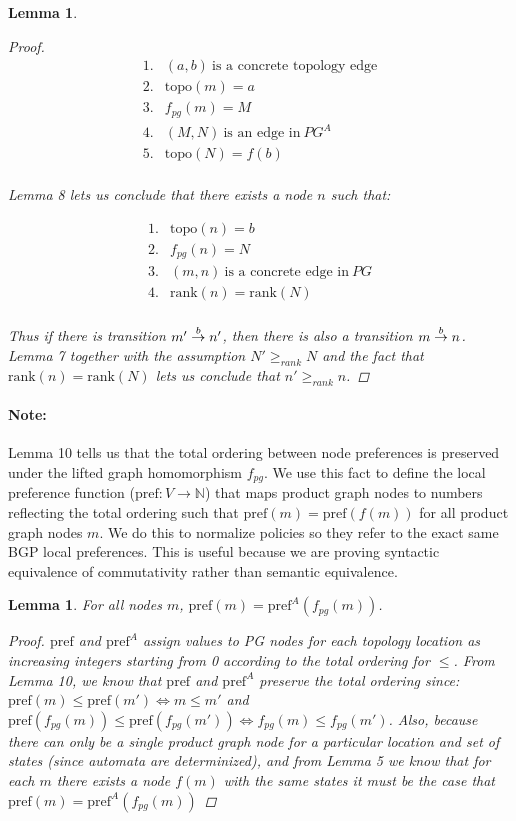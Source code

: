 \documentclass[twocolumn, openany]{sig-alternate-10pt}
\newcommand{\para}[1]{\paragraph*{\textbf{#1}}}
\newcommand{\Pref}{\ensuremath{\mathrm{pref}}}
\newcommand{\Topo}{\ensuremath{\mathrm{topo}}}
\newcommand{\Rank}{\ensuremath{\mathrm{rank}}}
\newtheorem{lem}[thm]{Lemma}
\begin{document}
\begin{lem}
\begin{proof}
    \[ \begin{array}{ll}
      1. & (a,b) ~\text{is a concrete topology edge} \\
      2. & \Topo(m) = a \\
      3. & f_{pg}(m) = M \\
      4. & (M,N) ~\text{is an edge in}~ PG^A \\
      5. & \Topo(N) = f(b) \\
    \end{array} \]

    \noindent
    Lemma 8 lets us conclude that there exists a node $n$ such that:

    \[ \begin{array}{ll}
      1. & \Topo(n) = b \\
      2. & f_{pg}(n) = N \\
      3. & (m,n) ~\text{is a concrete edge in}~ PG \\
      4. & \Rank(n) = \Rank(N) \\
    \end{array} \] 

    \noindent
    Thus if there is transition $\trans{m'}{n'}{b}$, then there is also a transition $\trans{m}{n}{b}$. 
    Lemma 7 together with the assumption $N' \geq_{rank} N$ and the fact that $\Rank(n) = \Rank(N)$ lets us conclude that $n' \geq_{rank} n$.

  \end{proof}

\end{lem}
%
%
\para{Note:}
Lemma 10 tells us that the total ordering between node preferences is preserved under the lifted graph homomorphism $f_{pg}$. 
We use this fact to define the local preference function ($\Pref : V \rightarrow \mathbb{N}$) that maps product graph nodes to numbers reflecting the total ordering such that $\Pref(m) = \Pref(f(m))$ for all product graph nodes $m$. We do this to normalize policies so they refer to the exact same BGP local preferences. This is useful because we are proving syntactic equivalence of commutativity rather than semantic equivalence.
%

\vspace{1em}
\begin{lem}
  For all nodes $m$, $\Pref(m) = \Pref^A(f_{pg}(m))$.
  \begin{proof}
    $\Pref$ and $\Pref^A$ assign values to PG nodes for each topology location as increasing integers starting from 0 according to the total ordering for $\leq$.
    From Lemma 10, we know that $\Pref$ and $\Pref^A$ preserve the total ordering since: $\Pref(m) \leq \Pref(m') \iff m \leq m'$ and $\Pref(f_{pg}(m)) \leq \Pref(f_{pg}(m')) \iff f_{pg}(m) \leq f_{pg}(m')$. Also, because there can only be a single product graph node for a particular location and set of states (since automata are determinized), and from Lemma 5 we know that for each $m$ there exists a node $f(m)$ with the same states it must be the case that $\Pref(m) = \Pref^A(f_{pg}(m))$
  \end{proof}
\end{lem}
\end{document}
